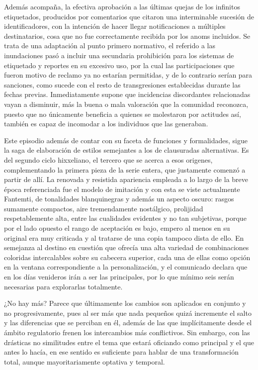 \documentclass[
]{book}
\begin{document}
Además acompaña, la efectiva aprobación a las últimas quejas de los infinitos etiquetados, producidos por comentarios que citaron una interminable sucesión de identificadores, con la intención de hacer llegar notificaciones a múltiples destinatarios, cosa que no fue correctamente recibida por los anoms incluidos. Se trata de una adaptación al punto primero normativo, el referido a las inundaciones pasó a incluir una secundaria prohibición para los sistemas de etiquetado y reportes en su excesivo uso, por la cual las participaciones que fueron motivo de reclamo ya no estarían permitidas, y de lo contrario serían para sanciones, como sucede con el resto de transgresiones establecidas durante las fechas previas. Inmediatamente supone que incidencias discordantes relacionadas vayan a disminuir, más la buena o mala valoración que la comunidad reconozca, puesto que no únicamente beneficia a quienes se molestaron por actitudes así, también es capaz de incomodar a los individuos que las generaban.

Este episodio además de contar con su faceta de funciones y formalidades, sigue la saga de elaboración de estilos semejantes a los de clausuradas alternativas. Es del segundo ciclo hixxeliano, el tercero que se acerca a esos origenes, complementando la primera pieza de la serie entera, que justamente comenzó a partir de allí. La renovada y resistida apariencia empleada a lo largo de la breve época referenciada fue el modelo de imitación y con esta se viste actualmente Fantemti, de tonalidades blanquinegras y además un aspecto oscuro: rasgos sumamente compactos, aire tremendamente nostálgico, prolijidad respetablemente alta, entre las cualidades evidentes y no tan subjetivas, porque por el lado opuesto el rango de aceptación es bajo, empero al menos en su original era muy criticada y al tratarse de una copia tampoco dista de ello. En semejanza al destino en cuestión que ofrecía una alta variedad de combinaciones coloridas intercalables sobre su cabecera superior, cada una de ellas como opción en la ventana correspondiente a la personalización, y el comunicado declara que en los días venideros irán a ser las principales, por lo que mínimo seis serán necesarias para explorarlas totalmente.

¿No hay más? Parece que últimamente los cambios son aplicados en conjunto y no progresivamente, pues al ser más que nada pequeños quizá incremente el salto y las diferencias que se perciban en él, además de las que implícitamente desde el ámbito regulatorio frenen los intercambios más conflictivos. Sin embargo, con las drásticas no similitudes entre el tema que estará oficiando como principal y el que antes lo hacía, en ese sentido es suficiente para hablar de una transformación total, aunque mayoritariamente optativa y temporal.
\end{document}
